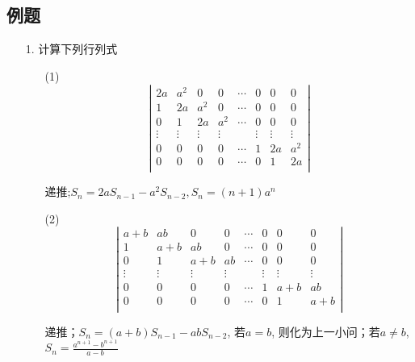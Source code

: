 \subsection*{例题}
\begin{itemize}
    \item[1.] 计算下列行列式
    \begin{itemize}
        \item[(1)]
        \begin{equation}
        \nonumber
        \left|
            \begin{array}{cccccccc}
            2a      &a^2     &0       &0      &\cdots & 0 &0 &0\\
            1       &2a      &a^2     &0      &\cdots & 0 &0 &0\\
            0       &1       &2a      &a^2    &\cdots & 0 &0 &0\\
            \vdots  &\vdots  &\vdots  &\vdots &       & \vdots & \vdots &\vdots\\
            0       &0       &0       &0      &\cdots & 1 &2a &a^2\\
            0       &0       &0       &0      &\cdots & 0 &1 &2a\\
            \end{array}
        \right|
        \end{equation} 
		\begin{solution}
		递推;$S_n = 2aS_{n-1} - a^2S_{n-2}, S_n = (n+1)a^n$
		\end{solution}
        \vspace{2cm}

        \item[(2)]
        \begin{equation}
        \nonumber
        \left|
            \begin{array}{cccccccc}
            a+b      &ab     &0       &0      &\cdots & 0 &0 &0\\
            1       &a+b     &ab     &0      &\cdots & 0 &0 &0\\
            0       &1       &a+b      &ab    &\cdots & 0 &0 &0\\
            \vdots  &\vdots  &\vdots  &\vdots &       & \vdots & \vdots &\vdots\\
            0       &0       &0       &0      &\cdots & 1 &a+b &ab\\
            0       &0       &0       &0      &\cdots & 0 &1 &a+b\\
            \end{array}
        \right|
        \end{equation} 
		\begin{solution}
		递推；$S_n = (a+b)S_{n-1}-abS_{n-2}$, 若$a = b$, 则化为上一小问；若$a\ne b$, $S_n = \frac{a^{n+1}-b^{n+1}}{a-b}$
		\end{solution}
        \vspace{2cm}


\end{itemize}
\end{itemize}
